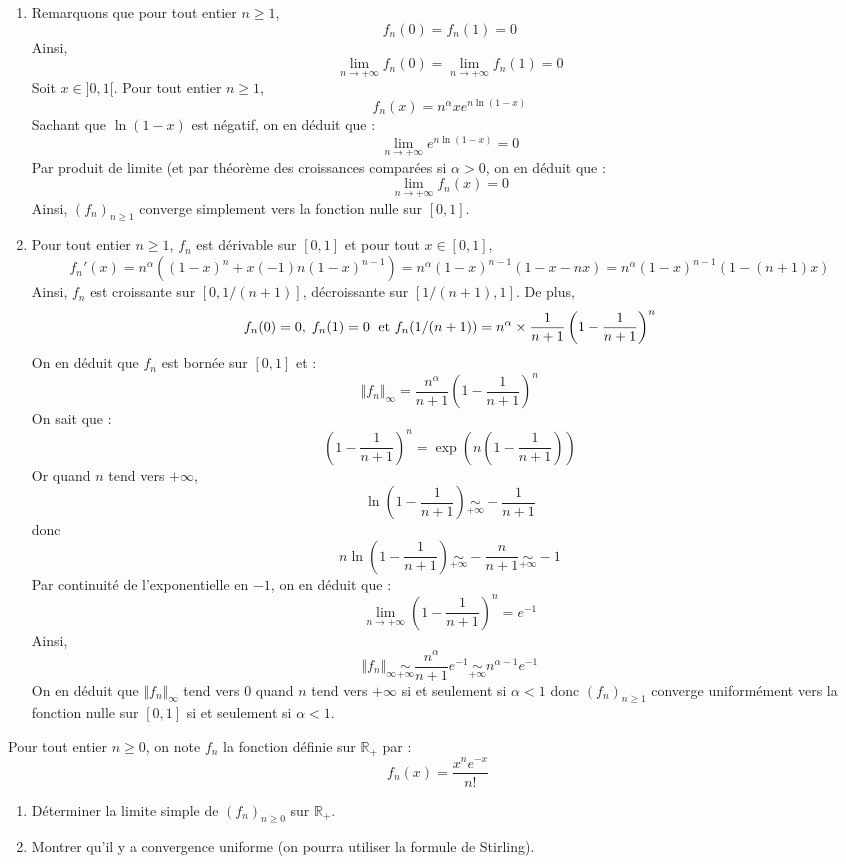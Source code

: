 \documentclass[a4paper,10pt]{report}
\begin{document}
\begin{enumerate}
\item Remarquons que pour tout entier $n \geq 1$,
$$ f_n(0)=f_n(1)=0$$
Ainsi,
$$ \lim_{n \rightarrow + \infty} f_n(0) = \lim_{n \rightarrow + \infty} f_n(1) = 0$$
Soit $x \in ]0,1[$. Pour tout entier $n \geq 1$,
$$ f_n(x) = n^{\alpha} x e^{n \ln(1-x)}$$
Sachant que $\ln(1-x)$ est négatif, on en déduit que :
$$ \lim_{n \rightarrow + \infty}e^{n \ln(1-x)} = 0$$
Par produit de limite (et par théorème des croissances comparées si $\alpha>0$, on en déduit que :
$$ \lim_{n \rightarrow + \infty} f_n(x) = 0$$
Ainsi, $(f_n)_{n \geq 1}$ converge simplement vers la fonction nulle sur $[0,1]$.
\item Pour tout entier $n \geq 1$, $f_n$ est dérivable sur $[0,1]$ et pour tout $x \in [0,1]$,
$$ f_n'(x) = n^{\alpha} ((1-x)^n + x (-1) n (1-x)^{n-1}) = n^{\alpha} (1-x)^{n-1} (1-x-nx) = n^{\alpha} (1-x)^{n-1} (1-(n+1)x)$$
Ainsi, $f_n$ est croissante sur $[0, 1/(n+1)]$, décroissante sur $[1/(n+1), 1]$. De plus,
$$ f_n(0)=0, \; f_n(1)=0 \; \hbox{ et } f_n(1/(n+1)) =n^{\alpha} \times \dfrac{1}{n+1} \left(1- \dfrac{1}{n+1}\right)^{n}$$
On en déduit que $f_n$ est bornée sur $[0,1]$ et :
$$ \Vert f_n \Vert_{\infty} =   \dfrac{n^{\alpha}}{n+1} \left(1- \dfrac{1}{n+1}\right)^{n}$$
On sait que :
$$\left(1- \dfrac{1}{n+1}\right)^{n} = \exp \left(n \left(1- \dfrac{1}{n+1}\right) \right) $$
Or quand $n$ tend vers $+ \infty$,
$$ \ln \left(1- \dfrac{1}{n+1}\right) \underset{+ \infty}{\sim} - \dfrac{1}{n+1}$$
donc 
$$ n \ln \left(1- \dfrac{1}{n+1}\right) \underset{+ \infty}{\sim} - \dfrac{n}{n+1} \underset{+ \infty}{\sim} -1$$
Par continuité de l'exponentielle en $-1$, on en déduit que :
$$ \lim_{n \rightarrow + \infty} \left(1- \dfrac{1}{n+1}\right)^{n} = e^{-1}$$
Ainsi,
$$  \Vert f_n \Vert_{\infty} \underset{+ \infty}{\sim} \dfrac{n^{\alpha}}{n+1} e^{-1} \underset{+ \infty}{\sim} n^{\alpha-1} e^{-1}$$
On en déduit que $\Vert f_n \Vert_{\infty}$ tend vers $0$ quand $n$ tend vers $+ \infty$ si et seulement si $\alpha<1$ donc $(f_n)_{n \geq 1}$ converge uniformément vers la fonction nulle sur $[0,1]$ si et seulement si $\alpha<1$.
\end{enumerate}

\begin{Exa} Pour tout entier $n \geq 0$, on note $f_n$ la fonction définie sur $\mathbb{R}_+$ par :
$$ f_n(x) = \frac{x^n e^{-x}}{n!}$$

\begin{enumerate}
\item Déterminer la limite simple de $(f_n)_{n \geq 0}$ sur $\mathbb{R}_+$.
\item Montrer qu'il y a convergence uniforme (on pourra utiliser la formule de Stirling).
\end{enumerate}
\end{Exa} 
\end{document}
